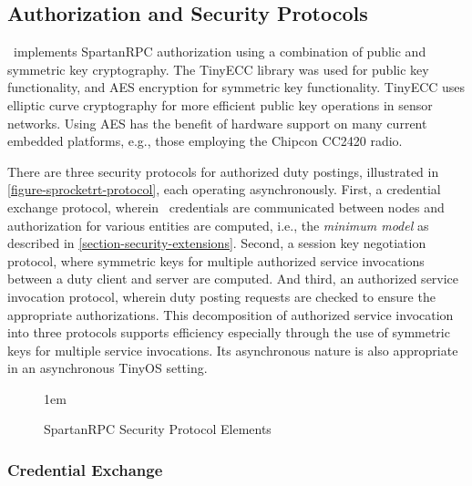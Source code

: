 \subsection{Authorization and Security Protocols}
\label{section-security-protocols}
\label{section-underlying-protocols}

\Sprocket\ implements SpartanRPC authorization using a combination of public and symmetric key
cryptography. The TinyECC library \cite{Liu-Peng-TinyECC-2008} was used for public key
functionality, and AES encryption for symmetric key functionality. TinyECC uses elliptic curve
cryptography for more efficient public key operations in sensor networks. Using AES has the
benefit of hardware support on many current embedded platforms, e.g., those employing the
Chipcon CC2420 radio.

There are three security protocols for authorized duty postings, illustrated in
\autoref{figure-sprocketrt-protocol}, each operating asynchronously. First, a credential
exchange protocol, wherein \RT\ credentials are communicated between nodes and authorization for
various entities are computed, i.e., the \emph{minimum model} as described in
\autoref{section-security-extensions}. Second, a session key negotiation protocol, where
symmetric keys for multiple authorized service invocations between a duty client and server are
computed. And third, an authorized service invocation protocol, wherein duty posting requests
are checked to ensure the appropriate authorizations. This decomposition of authorized service
invocation into three protocols supports efficiency especially through the use of symmetric keys
for multiple service invocations. Its asynchronous nature is also appropriate in an asynchronous
TinyOS setting.

\begin{figure}[t]
  
  \centerline{\raise 1em\box\graph}
  \vspace{2mm}
  \caption{SpartanRPC Security Protocol Elements}
  \label{figure-sprocketrt-protocol}
\end{figure}

\subsubsection{Credential Exchange}
\label{section-certificate-format}

